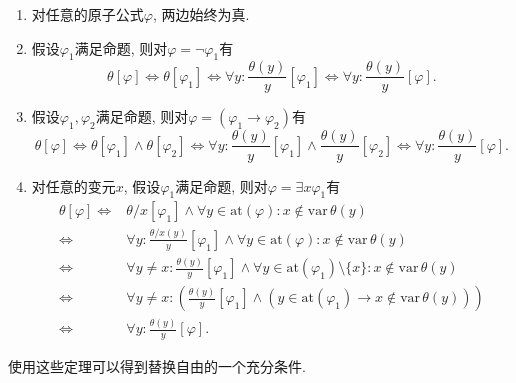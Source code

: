 \begin{enumerate}
    \item 对任意的原子公式$\varphi$, 两边始终为真.
    
    \item 假设$\varphi_1$满足命题, 则对$\varphi=\neg\varphi_1$有
    \[
        \theta[\varphi]\iff\theta[\varphi_1]\iff
        \forall y:\frac{\theta(y)}{y}[\varphi_1]\iff
        \forall y:\frac{\theta(y)}{y}[\varphi].
    \]

    \item 假设$\varphi_1,\varphi_2$满足命题, 则对$\varphi=(\varphi_1\to\varphi_2)$有
    \[
        \theta[\varphi]\iff\theta[\varphi_1]\land\theta[\varphi_2]\iff
        \forall y:\frac{\theta(y)}{y}[\varphi_1]\land\frac{\theta(y)}{y}[\varphi_2]
        \iff\forall y:\frac{\theta(y)}{y}[\varphi].
    \]

    \item 对任意的变元$x$, 假设$\varphi_1$满足命题,
    则对$\varphi=\exists x\varphi_1$有
    \vspace{3pt}
    \begin{equation*}\begin{aligned}
        \theta[\varphi]\iff&\theta/x[\varphi_1]\land
        \forall y\in\mathrm{at}(\varphi):x\notin\mathrm{var}\,\theta(y)\\
        \iff&\forall y:\frac{\theta/x(y)}{y}[\varphi_1]\land
        \forall y\in\mathrm{at}(\varphi):x\notin\mathrm{var}\,\theta(y)\\
        \iff&\forall y\neq x:\frac{\theta(y)}{y}[\varphi_1]\land
        \forall y\in\mathrm{at}(\varphi_1)\setminus\{x\}:
        x\notin\mathrm{var}\,\theta(y)\\
        \iff&\forall y\neq x:\left(\frac{\theta(y)}{y}[\varphi_1]\land
        (y\in\mathrm{at}(\varphi_1)\to x\notin\mathrm{var}\,\theta(y))\right)\\
        \iff&\forall y:\frac{\theta(y)}{y}[\varphi].
    \end{aligned}\tag*{\qedsymbol}\end{equation*}
\end{enumerate}


\vspace{10pt}

使用这些定理可以得到替换自由的一个充分条件.


